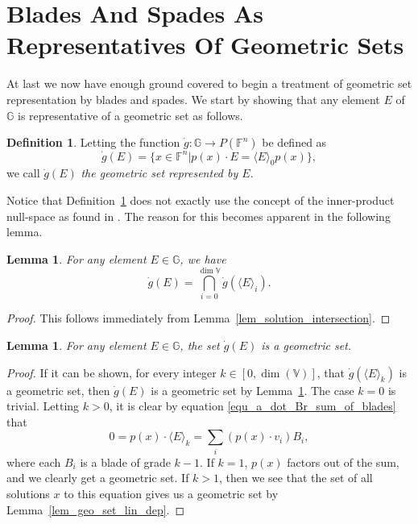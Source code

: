 \documentclass{birkjour}
\newtheorem{lem}[thm]{Lemma}
\theoremstyle{definition}
\newtheorem{defn}[thm]{Definition}
\theoremstyle{remark}
\numberwithin{equation}{section}
\newcommand{\F}{\mathbb{F}}
\newcommand{\G}{\mathbb{G}}
\newcommand{\V}{\mathbb{V}}
\newcommand{\gd}{\dot{g}}
\begin{document}
\section{Blades And Spades As Representatives Of Geometric Sets}

At last we now have enough ground covered to begin a treatment of geometric set representation by blades and spades.
We start by showing that any element $E$ of $\G$ is representative of a geometric set as follows.

\begin{defn}\label{def_geo_set_rep_by_E}
Letting the function $\gd:\G\to P(\F^n)$ be defined as
\begin{equation*}
\gd(E) = \{x\in\F^n|p(x)\cdot E=\langle E\rangle_0p(x)\},
\end{equation*}
we call $\gd(E)$ \emph{the geometric set represented by $E$}.
\end{defn}

Notice that Definition~\ref{def_geo_set_rep_by_E} does not exactly use the concept of
the inner-product null-space as found in \cite{}.  The reason for this becomes apparent
in the following lemma.

\begin{lem}\label{lem_intersect_grade_parts}
For any element $E\in\G$, we have
\begin{equation*}
\gd(E) = \bigcap_{i=0}^{\dim\V}\gd(\langle E\rangle_i).
\end{equation*}
\end{lem}
\begin{proof}
This follows immediately from Lemma~\ref{lem_solution_intersection}.
\end{proof}

\begin{lem}
For any element $E\in\G$, the set $\gd(E)$ is a geometric set.
\end{lem}
\begin{proof}
If it can be shown, for every integer $k\in[0,\dim(\V)]$, that $\gd(\langle E\rangle_k)$ is a geometric set,
then $\gd(E)$ is a geometric set by Lemma~\ref{lem_intersect_grade_parts}.
The case $k=0$ is trivial.  Letting $k>0$, it is clear by equation \eqref{equ_a_dot_Br_sum_of_blades} that
\begin{equation*}
0 = p(x)\cdot\langle E\rangle_k = \sum_i (p(x)\cdot v_i)B_i,
\end{equation*}
where each $B_i$ is a blade of grade $k-1$.  If $k=1$, $p(x)$ factors out of the sum, and we clearly get a geometric
set.  If $k>1$, then we see that the set of all solutions $x$
to this equation gives us a geometric set by Lemma~\ref{lem_geo_set_lin_dep}.
\end{proof}
\end{document}
